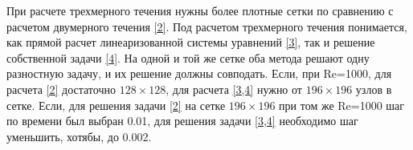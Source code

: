 При расчете трехмерного течения нужны более плотные сетки по сравнению с расчетом двумерного течения \ref{2}. Под расчетом трехмерного течения понимается, как прямой расчет линеаризованной системы уравнений \ref{3}, так и решение собственной задачи \ref{4}. На одной и той же сетке оба метода решают одну разностную задачу, и их решение должны совподать. Если, при Re=1000, для расчета \ref{2} достаточно $128 \times 128$, для расчета \ref{3,4} нужно от $196 \times 196$ узлов в сетке. Если, для решения задачи \ref{2} на сетке $196 \times 196$ при том же Re=1000 шаг по времени был выбран 0.01, для решения задачи \ref{3,4} необходимо шаг уменьшить, хотябы, до 0.002.  

